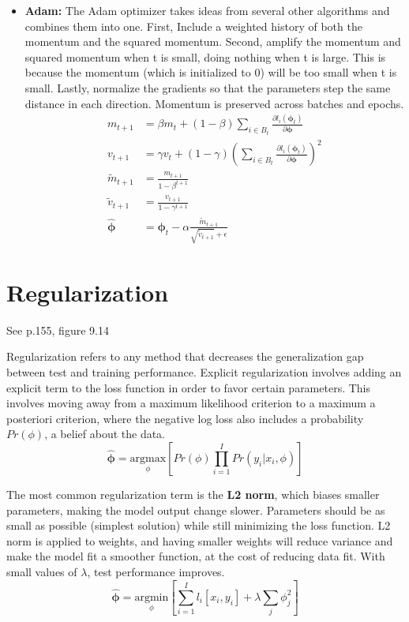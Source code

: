 \documentclass{article}
\begin{document}
\begin{itemize}
\item \textbf{Adam:} The Adam optimizer takes ideas from several other algorithms and combines them into one. First, Include a weighted history of both the momentum and the squared momentum. Second, amplify the momentum and squared momentum when t is small, doing nothing when t is large. This is because the momentum (which is initialized to 0) will be too small when t is small. Lastly, normalize the gradients so that the parameters step the same distance in each direction. Momentum is preserved across batches and epochs.
\begin{align*}
m_{t + 1} &= \beta m_t + (1 - \beta)\sum_{i \in B_t} \frac{\partial l_i(\boldsymbol{\phi}_t)}{\partial \boldsymbol{\phi}} \\
v_{t + 1} &= \gamma v_t + (1 - \gamma)\left(\sum_{i \in B_t} \frac{\partial l_i(\boldsymbol{\phi}_t)}{\partial \boldsymbol{\phi}}\right)^2 \tag{1} \\
\tilde{m}_{t + 1} &= \frac{m_{t + 1}}{1 - \beta^{t + 1}} \\
\tilde{v}_{t + 1} &= \frac{v_{t + 1}}{1 - \gamma^{t + 1}} \tag{2} \\
\boldsymbol{\hat{\phi}} &= \boldsymbol{\phi}_t - \alpha \frac{\tilde{m}_{t + 1}}{\sqrt{\tilde{v}_{t + 1}} + \epsilon} \tag{3}
\end{align*}
\end{itemize}

\section{Regularization}
See p.155, figure 9.14

Regularization refers to any method that decreases the generalization gap between test and training performance. Explicit regularization involves adding an explicit term to the loss function in order to favor certain parameters. This involves moving away from a maximum likelihood criterion to a maximum a posteriori criterion, where the negative log loss also includes a probability $Pr(\phi)$, a belief about the data.
\[ \boldsymbol{\hat{\phi}} = \underset{\phi}{\text{argmax}}\left[Pr(\phi)\prod_{i = 1}^{I} Pr(y_i|x_i, \phi)\right] \]

The most common regularization term is the \textbf{L2 norm}, which biases smaller parameters, making the model output change slower. Parameters should be as small as possible (simplest solution) while still minimizing the loss function. L2 norm is applied to weights, and having smaller weights will reduce variance and make the model fit a smoother function, at the cost of reducing data fit. With small values of $\lambda$, test performance improves.
\[ \boldsymbol{\hat{\phi}} = \underset{\phi}{\text{argmin}}\left[\sum_{i = 1}^{I} l_i[x_i, y_i] + \lambda \sum_{j}\phi_j^2\right] \]
\end{document}
